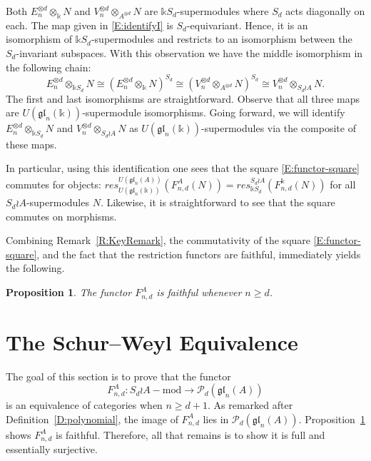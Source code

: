 \documentclass[11pt,reqno]{amsart} %
\newtheorem{proposition}[theorem]{Proposition}
\newcommand{\gl}{\mathfrak{gl}}
\renewcommand{\k}{\mathds{k}}
\newcommand{\0}{\bar{0}}
\newcommand{\1}{\bar{1}}
\newcommand{\wreath}{\wr}
\newcommand{\SdwreathA}{S_{d} \wreath A}
\newcommand{\Pol}{\mathcal{P}}
\numberwithin{equation}{subsection}
\begin{document}
Both $E_{n}^{\otimes d}  \otimes_{\k} N$ and $V_{n}^{\otimes d}\otimes_{A^{\otimes d}} N$ are $\k S_{d}$-supermodules where $S_{d}$ acts diagonally on each.  The map given in \eqref{E:identifyI} is $S_{d}$-equivariant.  Hence, it is an isomorphism of $\k S_{d}$-supermodules and restricts to an isomorphism between the $S_{d}$-invariant subspaces.  With this observation we have the middle isomorphism in the following chain:
\begin{equation}\label{E:identifyII}
 E_{n}^{\otimes d}  \otimes_{\k S_{d}} N  \cong\left(  E_{n}^{\otimes d} \otimes_{\k} N \right)^{S_{d}}  \cong \left(  V_{n}^{\otimes d} \otimes_{A^{\otimes d}} N \right)^{S_{d}} \cong  V_{n}^{\otimes d}  \otimes_{\SdwreathA} N.
\end{equation}  The first and last isomorphisms are straightforward.  Observe that all three maps are $U(\gl_{n}(\k))$-supermodule isomorphisms.  Going forward, we will identify $E_{n}^{\otimes d}  \otimes_{\k S_{d}} N$ and $ V_{n}^{\otimes d}  \otimes_{\SdwreathA} N$ as $U(\gl_{n}(\k))$-supermodules via the composite of these maps.

In particular, using this identification one sees that the square \eqref{E:functor-square} commutes for objects: $res_{U(\gl_{n}(\k))}^{U(\gl_{n}(A))}\left( F_{n,d}^{A}(N)\right) = res_{\k S_{d}}^{S_{d} \wreath A}\left( F_{n,d}^{\k}(N)\right)$ for all $\SdwreathA$-supermodules $N$. Likewise, it is straightforward to see that the square commutes on morphisms.

Combining Remark~\ref{R:KeyRemark}, the commutativity of the square \eqref{E:functor-square}, and the fact that the restriction functors are faithful, immediately yields the following.

\begin{proposition}\label{P:SWisFaithful} The functor $F_{n,d}^{A}$ is faithful whenever $n \geq d$.
\end{proposition}



\section{The Schur--Weyl Equivalence}

The goal of this section is to prove that the functor 
\[
F^{A}_{n,d}: S_{d}\wreath A-\textrm{mod} \to \Pol_{d}(\gl_{n}(A))
\] is an equivalence of categories when $n\geq d+1$.  As remarked after Definition~\ref{D:polynomial}, the image of $F^{A}_{n,d}$ lies in $\Pol_{d}(\gl_{n}(A))$.  Proposition~\ref{P:SWisFaithful} shows $F^{A}_{n,d}$ is faithful.  Therefore, all that remains is to show it is full and essentially surjective.
\end{document}
